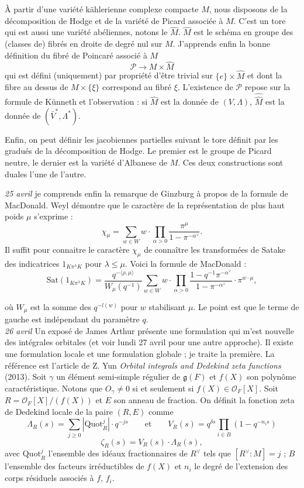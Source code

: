 \documentclass[11.8pt]{amsart}
\newcommand\g{{\mathfrak{g}}}
\theoremstyle{plain}
\theoremstyle{definition}
\theoremstyle{remark}
\begin{document}
À partir d'une variété kählerienne complexe compacte $M$, nous disposons de la décomposition de Hodge et de la variété de Picard associée à $M$. C'est un tore qui est aussi une variété abéliennes, notons le $\hat M$. $\hat M$ est le schéma en groupe des (classes de) fibrés en droite de degré nul sur $M$. J'apprends enfin la bonne définition du fibré de Poincaré associé à $M$ $$\mathcal P \rightarrow M\times \hat M$$
qui est défini (uniquement) par propriété d'être trivial sur $\{e\}\times \hat M$ et dont la fibre au dessus de $M\times \{\xi\}$  correspond au fibré $\xi$. L'existence de $\mathcal P$ repose sur la formule de Künneth et l'observation : si $\hat M$ est la donnée de $(V,\Lambda)$, $\hat\hat M$ est la donnée de $(\bar V^*, \Lambda^*)$.

Enfin, on peut définir les jacobiennes partielles suivant le tore définit par les gradués de la décomposition de Hodge. Le premier est le groupe de Picard neutre, le dernier est la variété d'Albanese de $M$. Ces deux constructions sont duales l'une de l'autre.

\textsl{25 avril} \quad je comprends enfin la remarque de Ginzburg à propos de la formule de MacDonald. Weyl démontre que le caractère de la représentation de plus haut poids $\mu$ s'exprime : $$\chi_\mu = \sum_{w\in W}w \cdot \prod_{\alpha>0}\frac{\pi^\mu}{1-\pi^{-\alpha^\vee}}.$$ Il suffit pour connaitre le caractère $\chi_\mu$ de connaître les transformées de Satake des indicatrices $1_{K\pi^\lambda K}$ pour $\lambda \le \mu$. Voici la formule de MacDonald : 
$$\mathrm{Sat}(1_{K\pi^\lambda K}) = \frac{q^{-\langle \rho, \mu \rangle}}{W_\mu(q^{-1})}\sum_{w\in W} w \cdot \prod_{\alpha>0}\frac{1-q^{-1}\pi^{-\alpha^\vee}}{1-\pi^{-\alpha^\vee}} \cdot \pi^{w\cdot \mu},$$

où $W_\mu$ est la somme des $q^{-l(w)}$ pour $w$ stabilisant $\mu$. Le point est que le terme de gauche est indépendant du paramètre $q$.\\

\textsl{26 avril} \quad Un exposé de James Arthur présente une formulation qui m'est nouvelle des intégrales orbitales (et voir lundi 27 avril pour une autre approche). Il existe une formulation locale et une formulation globale ; je traite la première. La référence est l'article de Z. Yun \textit{Orbital integrals and Dedekind zeta functions} (2013). Soit $\gamma$ un élément semi-simple régulier de $\g(F)$ et $f(X)$ son polynôme caractéristique. Notons que $O_\gamma \ne 0$ si et seulement si $f(X)\in \mathcal O_F[X]$. Soit $R =  \mathcal O_F[X]/(f(X))$ et $E$ son anneau de fraction. On définit la fonction zeta de Dedekind locale de la paire $(R,E)$ comme $$\Lambda_R(s) = \sum_{j\ge 0} |\mathrm{Quot}^j_R|\cdot q^{-js} \qquad \text{et} \qquad V_R(s) = q^{\delta s}\prod_{i\in B}(1-q^{-n_is})$$
$$\zeta_R(s) = V_R(s)\cdot \Lambda_R(s),$$
avec $\mathrm{Quot}^j_R$ l'ensemble des idéaux fractionnaires de $R^\vee$ tels que $[R^\vee : M]=j$ ; $B$ l'ensemble des facteurs irréductibles de $f(X)$ et $n_i$ le degré de l'extension des corps résiduels associés à $f$, $f_i$.
\end{document}
